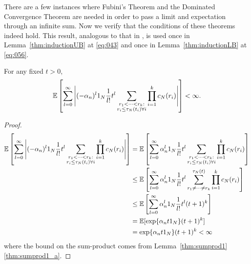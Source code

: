 There are a few instances where Fubini's Theorem and the Dominated Convergence Theorem are needed in order to pass a limit and expectation through an infinite sum.
Now we verify that the conditions of these theorems indeed hold.
This result, analogous to that in \textcite[Appendix]{koskela2018}, is used once
in Lemma~\ref{thm:inductionUB} at \eqref{eq:043} and once in Lemma~\ref{thm:inductionLB} at \eqref{eq:056}.
\begin{lemma}\label{thm:DCT_Fubini}
For any fixed $t>0$,
\begin{equation*}
\mathbb{E} \left[ \sum_{l=0}^\infty \Bigg| (-\alpha_n)^l 1_N \frac{1}{l!} t^l 
        \sum_{\substack{r_1 < \cdots < r_k : \\ r_i \leq \tau_N(t_i) \forall i}}
        \prod_{i=1}^k c_N(r_i) \Bigg| \right]
< \infty .
\end{equation*}
\end{lemma}

\begin{proof}
\begin{align*}
\mathbb{E} \left[ \sum_{l=0}^\infty \Bigg| (-\alpha_n)^l 1_N \frac{1}{l!} t^l 
        \sum_{\substack{r_1 < \cdots < r_k : \\ r_i \leq \tau_N(t_i) \forall i}}
        \prod_{i=1}^k c_N(r_i) \Bigg| \right]
&= \mathbb{E} \left[ \sum_{l=0}^\infty \alpha_n^l 1_N \frac{1}{l!} t^l 
        \sum_{\substack{r_1 < \cdots < r_k : \\ r_i \leq \tau_N(t_i) \forall i}}
        \prod_{i=1}^k c_N(r_i) \right] \\
&\leq \mathbb{E} \left[ \sum_{l=0}^\infty \alpha_n^l 1_N \frac{1}{l!} t^l 
        \sum_{r_1 \neq \cdots \neq r_k}^{\tau_N(t)}
        \prod_{i=1}^k c_N(r_i) \right] \\        
&\leq \mathbb{E} \left[ \sum_{l=0}^\infty \alpha_n^l 1_N \frac{1}{l!} t^l 
        (t+1)^k \right] \\
&= \mathbb{E}[ \exp\{ \alpha_n t 1_N \} (t+1)^k ]\\
&= \exp\{ \alpha_n t 1_N \} (t+1)^k
< \infty 
\end{align*}
where the bound on the sum-product comes from Lemma~\ref{thm:sumprod1}\ref{thm:sumprod1_a}.
\end{proof}



